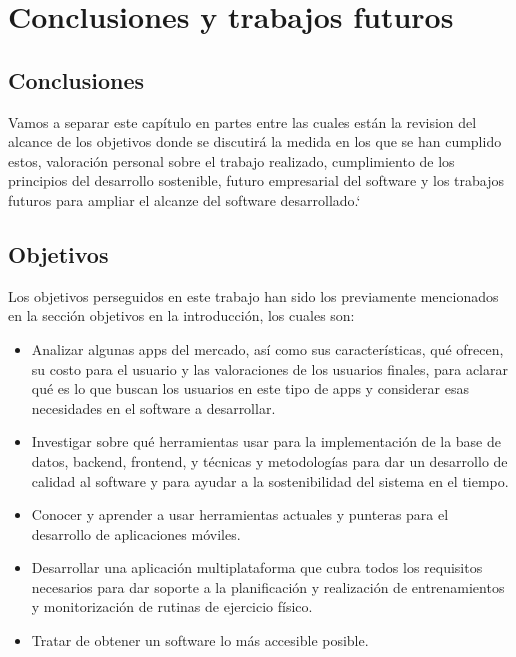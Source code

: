 \chapter{Conclusiones y trabajos futuros}

\section{Conclusiones}

Vamos a separar este capítulo en partes entre las cuales están la revision del alcance de los objetivos donde se discutirá la medida en los que se han cumplido estos, valoración personal sobre el trabajo realizado, cumplimiento de los principios del desarrollo sostenible, futuro empresarial del software y los trabajos futuros para ampliar el alcanze del software desarrollado.`

\section{Objetivos}

Los objetivos perseguidos en este trabajo han sido los previamente mencionados en la sección objetivos en la introducción, los cuales son:
\begin{itemize}
	\item Analizar algunas apps del mercado, así como sus características, qué ofrecen, su costo para el usuario y las valoraciones de los usuarios finales, para aclarar qué es lo que buscan los usuarios en este tipo de apps y considerar esas necesidades en el software a desarrollar.
	\item Investigar sobre qué herramientas usar para la implementación de la base de datos, backend, frontend, y técnicas y metodologías para dar un desarrollo de calidad al software y para ayudar a la sostenibilidad del sistema en el tiempo.
	\item Conocer y aprender a usar herramientas actuales y punteras para el desarrollo de aplicaciones móviles. 
	\item Desarrollar una aplicación multiplataforma que cubra todos los requisitos necesarios para dar soporte a la planificación y realización de entrenamientos y monitorización de rutinas de ejercicio físico. 
	\item Tratar de obtener un software lo más accesible posible.
\end{itemize}

